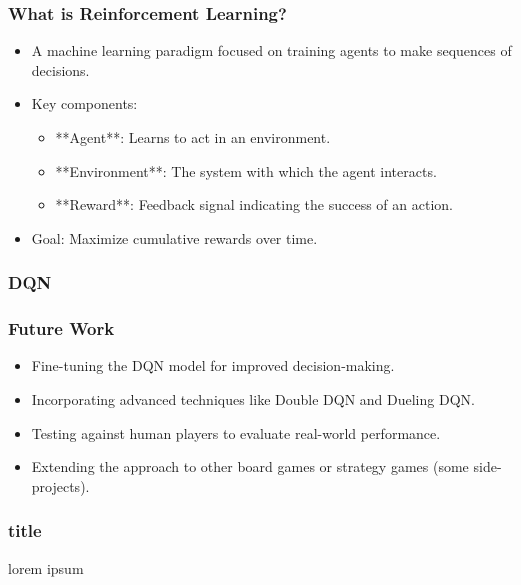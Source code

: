 \begin{frame}
	\frametitle{What is Reinforcement Learning?}
	\vspace{0.5cm}
	\begin{itemize}
		\item A machine learning paradigm focused on training agents to make sequences of decisions.
		\item Key components:
		\begin{itemize}
			\item **Agent**: Learns to act in an environment.
			\item **Environment**: The system with which the agent interacts.
			\item **Reward**: Feedback signal indicating the success of an action.
		\end{itemize}
		\item Goal: Maximize cumulative rewards over time.
	\end{itemize}
\end{frame}



\begin{frame}
	\frametitle{DQN}
	\vspace{0.5cm}
\end{frame}





\begin{frame}
	\frametitle{Future Work}
	\vspace{0.5cm}
	\begin{itemize}
		\item Fine-tuning the DQN model for improved decision-making.
		\item Incorporating advanced techniques like Double DQN and Dueling DQN.
		\item Testing against human players to evaluate real-world performance.
		\item Extending the approach to other board games or strategy games (some side-projects).
	\end{itemize}
\end{frame}

\PraesentationMasterWeissBlau
\begin{frame}
\end{frame}
\PraesentationMasterStandard

\begin{frame}
    \frametitle{title}
    \vspace{0.5cm}
    lorem ipsum
\end{frame}






